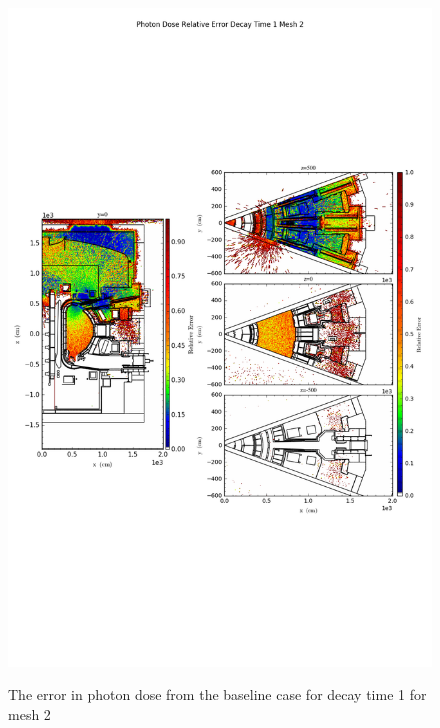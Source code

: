 \begin{figure}[ht!]
\centering
\includegraphics[trim={0cm 9cm 0cm 10cm},clip,scale=0.75]{../plots/final_model_nob4c/Photon_Dose_Relative_Error_Decay_Time_1_Mesh_2.png}
\label{fig:photons_dc1_no4bc_m2_error}
\caption{The error in photon dose from the baseline case for decay time 1 for mesh 2}
\end{figure}
